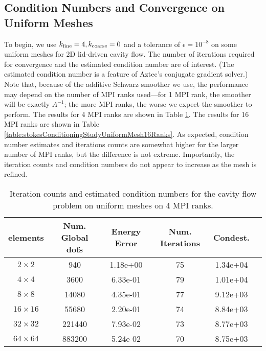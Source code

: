 \documentclass[11pt]{amsart}
\begin{document}
\subsection{Condition Numbers and Convergence on Uniform Meshes}
\label{sec:convergenceStokesUniformMeshes}
To begin, we use $k_{\rm fine} = 4, k_{\rm coarse} = 0$ and a tolerance of $\epsilon = 10^{-8}$ on some uniform meshes for 2D lid-driven cavity flow.  The number of iterations required for convergence and the estimated condition number are of interest.  (The estimated condition number is a feature of Aztec's conjugate gradient solver.)  Note that, because of the additive Schwarz smoother we use, the performance may depend on the number of MPI ranks used---for 1 MPI rank, the smoother will be exactly $A^{-1}$; the more MPI ranks, the worse we expect the smoother to perform.  The results for 4 MPI ranks are shown in Table \ref{table:stokesConditioningStudyUniformMesh4Ranks}.  The results for 16 MPI ranks are shown in Table \ref{table:stokesConditioningStudyUniformMesh16Ranks}.  As expected, condition number estimates and iterations counts are somewhat higher for the larger number of MPI ranks, but the difference is not extreme.  Importantly, the iteration counts and condition numbers do not appear to increase as the mesh is refined.

\begin{table}
\begin{tabular}{ c  c  c  c  c  c }
elements	& Num. Global dofs	&Energy Error	&Num. Iterations	&Condest.		\\
\hline
$2 \times 2$	&940		&1.18e+00	&75	&1.34e+04\\
$4 \times 4$	&3600		&6.33e-01		&79	&1.01e+04\\
$8 \times 8$	&14080		&4.35e-01		&77	&9.12e+03\\
$16 \times 16$	&55680		&2.20e-01		&74	&8.84e+03\\
$32 \times 32$	&221440		&7.93e-02		&73	&8.77e+03\\
$64 \times 64$	&883200		&5.24e-02		&70	& 8.75e+03\\
\end{tabular}
\caption{Iteration counts and estimated condition numbers for the cavity flow problem on uniform meshes on 4 MPI ranks.}
\label{table:stokesConditioningStudyUniformMesh4Ranks}
\end{table}
\end{document}
